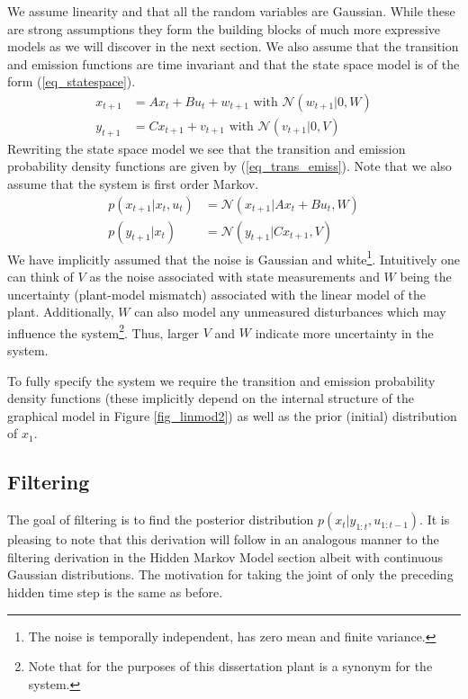 \documentclass[../masters.tex]{subfiles}
\begin{document}
We assume linearity and that all the random variables are Gaussian. While these are strong assumptions they form the building blocks of much more expressive models as we will discover in the next section. We also assume that the transition and emission functions are time invariant and that the state space model is of the form (\ref{eq_statespace}).
\begin{equation}
\begin{aligned}
x_{t+1} &= Ax_t + Bu_t + w_{t+1} \text{ with } \mathcal{N}(w_{t+1}|0,W) \\
y_{t+1} &= Cx_{t+1} + v_{t+1}  \text{ with } \mathcal{N}(v_{t+1}|0,V)
\end{aligned}
\label{eq_statespace}
\end{equation}
Rewriting the state space model we see that the transition and emission probability density functions are given by (\ref{eq_trans_emiss}). Note that we also assume that the system is first order Markov.
\begin{equation}
\begin{aligned}
p(x_{t+1}|x_t, u_t)&= \mathcal{N}(x_{t+1}|Ax_t+Bu_t, W) \\
p(y_{t+1}|x_t) &= \mathcal{N}(y_{t+1}|Cx_{t+1}, V)
\end{aligned}
\label{eq_trans_emiss}
\end{equation}
We have implicitly assumed that the noise is Gaussian and white\footnote{The noise is temporally independent, has zero mean and finite variance.}. Intuitively one can think of $V$ as the noise associated with state measurements and $W$ being the uncertainty (plant-model mismatch) associated with the linear model of the plant. Additionally, $W$ can also model any unmeasured disturbances which may influence the system\footnote{Note that for the purposes of this dissertation plant is a synonym for the system.}. Thus, larger $V$ and $W$ indicate more uncertainty in the system. 

To fully specify the system we require the transition and emission probability density functions (these implicitly depend on the internal structure of the graphical model in Figure \ref{fig_linmod2}) as well as the prior (initial) distribution of $x_1$.

\subsection{Filtering}
The goal of filtering is to find the posterior distribution $p(x_{t}|y_{1:t}, u_{1:t-1})$. It is pleasing to note that this derivation will follow in an analogous manner to the filtering derivation in the Hidden Markov Model section albeit with continuous Gaussian distributions. The motivation for taking the joint of only the preceding hidden time step is the same as before. 
\end{document}
